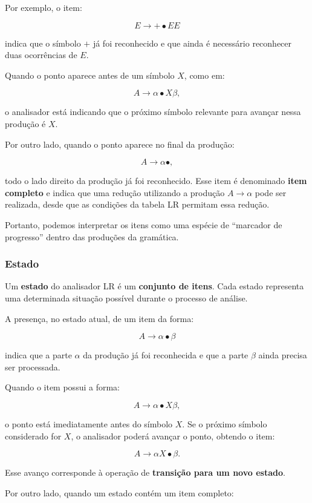 \documentclass[
  brazilian,
  letterpaper,
]{book}
\theoremstyle{plain}
\theoremstyle{definition}
\theoremstyle{remark}
\begin{document}
Por exemplo, o item:

\[
E\rightarrow+\bullet EE
\]

indica que o símbolo \(+\) já foi reconhecido e que ainda é necessário
reconhecer duas ocorrências de \(E\).

Quando o ponto aparece antes de um símbolo \(X\), como em:

\[
A\rightarrow\alpha\bullet X\beta,
\]

o analisador está indicando que o próximo símbolo relevante para avançar
nessa produção é \(X\).

Por outro lado, quando o ponto aparece no final da produção:

\[
A\rightarrow\alpha\bullet,
\]

todo o lado direito da produção já foi reconhecido. Esse item é
denominado \textbf{item completo} e indica que uma redução utilizando a
produção \(A\rightarrow\alpha\) pode ser realizada, desde que as
condições da tabela LR permitam essa redução.

Portanto, podemos interpretar os itens como uma espécie de ``marcador de
progresso'' dentro das produções da gramática.

\subsubsection{Estado}\label{estado}

Um \textbf{estado} do analisador LR é um \textbf{conjunto de itens}.
Cada estado representa uma determinada situação possível durante o
processo de análise.

A presença, no estado atual, de um item da forma:

\[
A\rightarrow\alpha\bullet\beta
\]

indica que a parte \(\alpha\) da produção já foi reconhecida e que a
parte \(\beta\) ainda precisa ser processada.

Quando o item possui a forma:

\[
A\rightarrow\alpha\bullet X\beta,
\]

o ponto está imediatamente antes do símbolo \(X\). Se o próximo símbolo
considerado for \(X\), o analisador poderá avançar o ponto, obtendo o
item:

\[
A\rightarrow\alpha X\bullet\beta.
\]

Esse avanço corresponde à operação de \textbf{transição para um novo
estado}.

Por outro lado, quando um estado contém um item completo:
\end{document}
